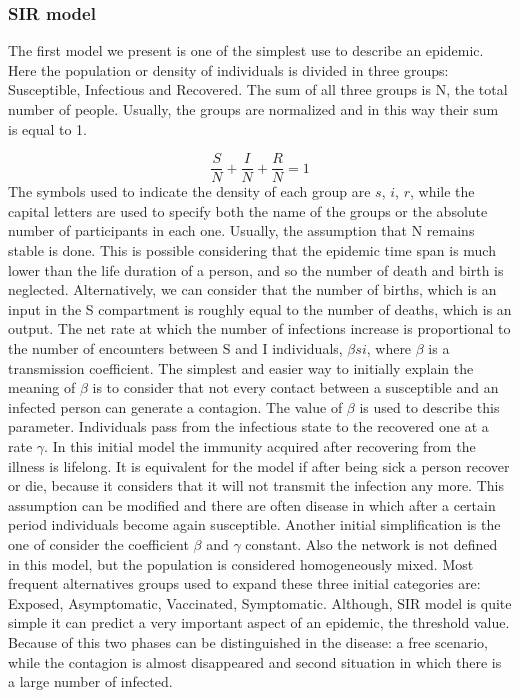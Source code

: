 \subsubsection{SIR model}
\label{subsec:SIR}
The first model we present is one of the simplest use to describe an epidemic. Here the population or density of individuals is divided in three groups: Susceptible, Infectious and Recovered. 
The sum of all three groups is N, the total number of people. Usually, the groups are normalized and in this way their sum is equal to 1. 

\begin{equation}
	\frac{S}{N} + \frac{I}{N} + \frac{R}{N} = 1 
\end{equation}
The symbols used to indicate the density of each group are $s$, $i$, $r$, while the capital letters are used to specify both the name of the groups or the absolute number of participants in each one. 
Usually, the assumption that N remains stable is done. This is possible considering that the epidemic time span is much lower than the life duration of a person, and so the number of death and birth is neglected. Alternatively, we can consider that the number of births, which is an input in the S compartment is roughly equal to the number of deaths, which is an output. 
The net rate at which the number of infections increase is proportional to the number of encounters between S and I individuals, $ \beta s i $, where $\beta$ is a transmission coefficient. The simplest and easier way to initially explain the meaning of $\beta$ is to consider that not every contact between a susceptible and an infected person can generate a contagion. The value of $\beta$ is used to describe this parameter. 
Individuals pass from the infectious state to the recovered one at a rate $\gamma$. In this initial model the immunity acquired after recovering from the illness is lifelong. It is equivalent for the model if after being sick a person recover or die, because it considers that it will not transmit the infection any more.  This assumption can be modified and there are often disease in which after a certain period individuals become again susceptible. Another initial simplification is the one of consider the coefficient $\beta$ and $\gamma$ constant. Also the network is not defined in this model, but the population is considered homogeneously mixed. 
Most frequent alternatives groups used to expand these three initial categories are: Exposed, Asymptomatic, Vaccinated, Symptomatic. 
Although, SIR model is quite simple it can predict a very important aspect of an epidemic, the threshold value. Because of this two phases can be distinguished in the disease: a free scenario, while the contagion is almost disappeared and second situation in which there is a large number of infected.

